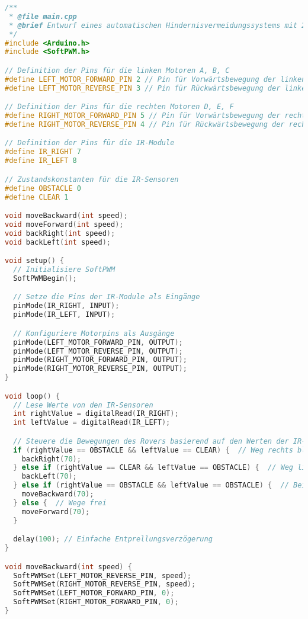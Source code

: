 \documentclass{vorlage-design-main}
\begin{document}
\begin{lstlisting}[language={C++}]
/**
 * @file main.cpp
 * @brief Entwurf eines automatischen Hindernisvermeidungssystems mit 2x Infarotsensoren
 */
#include <Arduino.h>
#include <SoftPWM.h>

// Definition der Pins für die linken Motoren A, B, C
#define LEFT_MOTOR_FORWARD_PIN 2 // Pin für Vorwärtsbewegung der linken Motoren (A, B, C)
#define LEFT_MOTOR_REVERSE_PIN 3 // Pin für Rückwärtsbewegung der linken Motoren (A, B, C)

// Definition der Pins für die rechten Motoren D, E, F
#define RIGHT_MOTOR_FORWARD_PIN 5 // Pin für Vorwärtsbewegung der rechten Motoren (D, E, F)
#define RIGHT_MOTOR_REVERSE_PIN 4 // Pin für Rückwärtsbewegung der rechten Motoren (D, E, F)

// Definition der Pins für die IR-Module
#define IR_RIGHT 7
#define IR_LEFT 8

// Zustandskonstanten für die IR-Sensoren
#define OBSTACLE 0
#define CLEAR 1

void moveBackward(int speed);
void moveForward(int speed);
void backRight(int speed);
void backLeft(int speed);

void setup() {
  // Initialisiere SoftPWM
  SoftPWMBegin();

  // Setze die Pins der IR-Module als Eingänge
  pinMode(IR_RIGHT, INPUT);
  pinMode(IR_LEFT, INPUT);

  // Konfiguriere Motorpins als Ausgänge
  pinMode(LEFT_MOTOR_FORWARD_PIN, OUTPUT);
  pinMode(LEFT_MOTOR_REVERSE_PIN, OUTPUT);
  pinMode(RIGHT_MOTOR_FORWARD_PIN, OUTPUT);
  pinMode(RIGHT_MOTOR_REVERSE_PIN, OUTPUT);
}

void loop() {
  // Lese Werte von den IR-Sensoren
  int rightValue = digitalRead(IR_RIGHT);
  int leftValue = digitalRead(IR_LEFT);

  // Steuere die Bewegungen des Rovers basierend auf den Werten der IR-Sensoren
  if (rightValue == OBSTACLE && leftValue == CLEAR) {  // Weg rechts blockiert
    backRight(70);
  } else if (rightValue == CLEAR && leftValue == OBSTACLE) {  // Weg links blockiert
    backLeft(70);
  } else if (rightValue == OBSTACLE && leftValue == OBSTACLE) {  // Beide Wege blockiert
    moveBackward(70);
  } else {  // Wege frei
    moveForward(70);
  }

  delay(100); // Einfache Entprellungsverzögerung
}

void moveBackward(int speed) {
  SoftPWMSet(LEFT_MOTOR_REVERSE_PIN, speed);
  SoftPWMSet(RIGHT_MOTOR_REVERSE_PIN, speed);
  SoftPWMSet(LEFT_MOTOR_FORWARD_PIN, 0);
  SoftPWMSet(RIGHT_MOTOR_FORWARD_PIN, 0);
}


\end{lstlisting}
\end{document}
